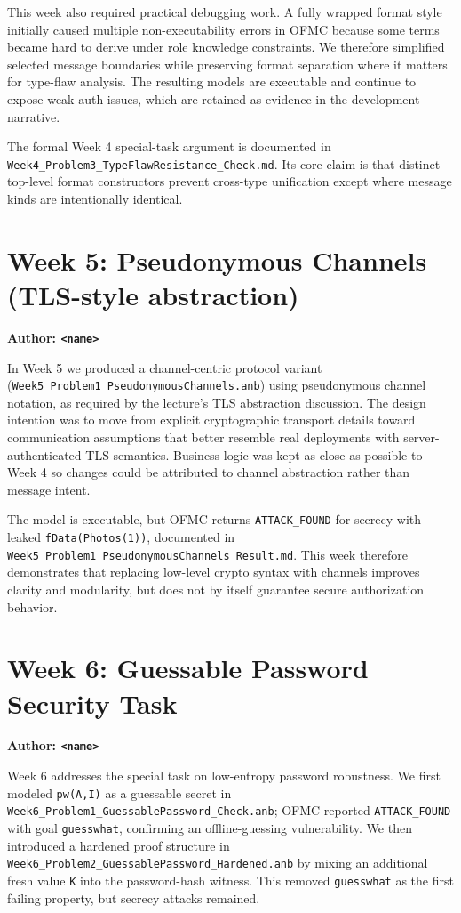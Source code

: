 \documentclass[11pt,a4paper]{article}
\begin{document}
This week also required practical debugging work.
A fully wrapped format style initially caused multiple non-executability errors in OFMC because some terms became hard to derive under role knowledge constraints.
We therefore simplified selected message boundaries while preserving format separation where it matters for type-flaw analysis.
The resulting models are executable and continue to expose weak-auth issues, which are retained as evidence in the development narrative.

The formal Week 4 special-task argument is documented in
\texttt{Week4\_Problem3\_TypeFlawResistance\_Check.md}.
Its core claim is that distinct top-level format constructors prevent cross-type unification except where message kinds are intentionally identical.

\section{Week 5: Pseudonymous Channels (TLS-style abstraction)}
\textbf{Author: \texttt{<name>}}

In Week 5 we produced a channel-centric protocol variant
(\texttt{Week5\_Problem1\_PseudonymousChannels.anb}) using pseudonymous channel notation, as required by the lecture's TLS abstraction discussion.
The design intention was to move from explicit cryptographic transport details toward communication assumptions that better resemble real deployments with server-authenticated TLS semantics.
Business logic was kept as close as possible to Week 4 so changes could be attributed to channel abstraction rather than message intent.

The model is executable, but OFMC returns \texttt{ATTACK\_FOUND} for secrecy with leaked \texttt{fData(Photos(1))}, documented in
\texttt{Week5\_Problem1\_PseudonymousChannels\_Result.md}.
This week therefore demonstrates that replacing low-level crypto syntax with channels improves clarity and modularity, but does not by itself guarantee secure authorization behavior.

\section{Week 6: Guessable Password Security Task}
\textbf{Author: \texttt{<name>}}

Week 6 addresses the special task on low-entropy password robustness.
We first modeled \texttt{pw(A,I)} as a guessable secret in
\texttt{Week6\_Problem1\_GuessablePassword\_Check.anb}; OFMC reported \texttt{ATTACK\_FOUND} with goal \texttt{guesswhat}, confirming an offline-guessing vulnerability.
We then introduced a hardened proof structure in
\texttt{Week6\_Problem2\_GuessablePassword\_Hardened.anb} by mixing an additional fresh value \texttt{K} into the password-hash witness.
This removed \texttt{guesswhat} as the first failing property, but secrecy attacks remained.
\end{document}
